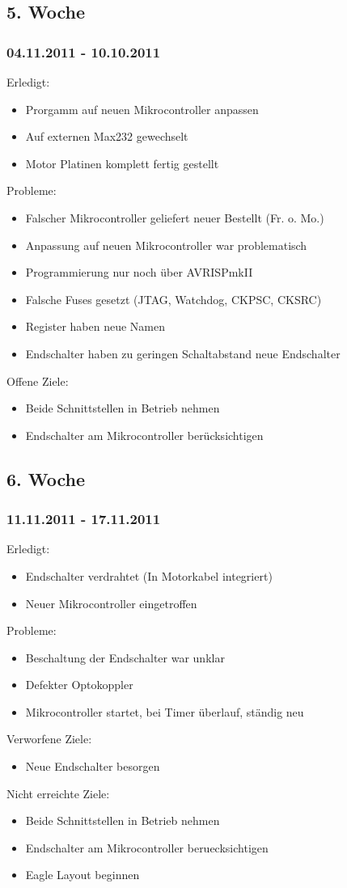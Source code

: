 \documentclass[ngerman]{beamer}
\begin{document}
\subsection{5. Woche}
\begin{frame}\frametitle{04.11.2011 - 10.10.2011}
Erledigt: 
\begin{itemize}
\item Prorgamm auf neuen Mikrocontroller anpassen 
\item Auf externen Max232 gewechselt 
\item Motor Platinen komplett fertig gestellt 
\end{itemize}
Probleme: 
\begin{itemize}
\item Falscher Mikrocontroller geliefert neuer Bestellt (Fr. o. Mo.) 
\item Anpassung auf neuen Mikrocontroller war problematisch 
\item Programmierung nur noch über AVRISPmkII 
\item Falsche Fuses gesetzt (JTAG, Watchdog, CKPSC, CKSRC) 
\item Register haben neue Namen 
\item Endschalter haben zu geringen Schaltabstand neue Endschalter
\end{itemize}
Offene Ziele: 
\begin{itemize}
\item Beide Schnittstellen in Betrieb nehmen 
\item Endschalter am Mikrocontroller berücksichtigen 
\end{itemize}
\end{frame}
\subsection{6. Woche}
\begin{frame}\frametitle{11.11.2011 - 17.11.2011}
Erledigt: 
\begin{itemize}
\item Endschalter verdrahtet (In Motorkabel integriert) 
\item Neuer Mikrocontroller eingetroffen 
\end{itemize}
Probleme: 
\begin{itemize}
\item Beschaltung der Endschalter war unklar 
\item Defekter Optokoppler 
\item Mikrocontroller startet, bei Timer überlauf, ständig neu 
\end{itemize}
Verworfene Ziele: 
\begin{itemize}
\item Neue Endschalter besorgen
\end{itemize}
Nicht erreichte Ziele: 
\begin{itemize}
\item Beide Schnittstellen in Betrieb nehmen 
\item Endschalter am Mikrocontroller beruecksichtigen 
\item Eagle Layout beginnen
\end{itemize}
\end{frame}
\end{document}
